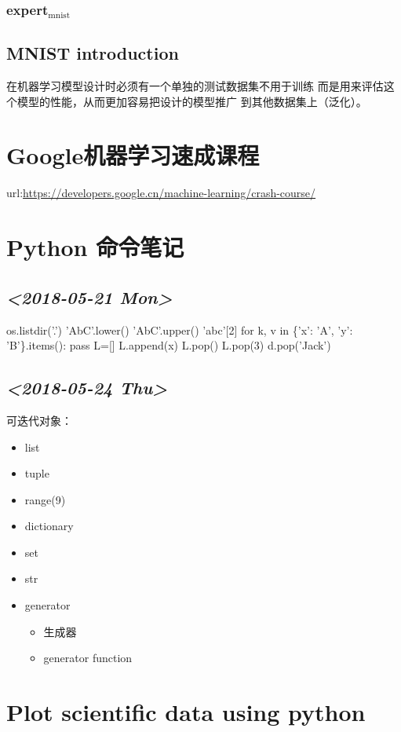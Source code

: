 \documentclass[11pt]{article}
\begin{document}
\subsubsection{expert\(_{\text{mnist}}\)}
\label{sec:orgc870cb3}
\subsection{MNIST introduction}
\label{sec:orgf936e7b}
在机器学习模型设计时必须有一个单独的测试数据集不用于训练
而是用来评估这个模型的性能，从而更加容易把设计的模型推广
到其他数据集上（泛化）。
\section{Google机器学习速成课程}
\label{sec:org5cb3d6a}
url:\url{https://developers.google.cn/machine-learning/crash-course/}
\section{Python 命令笔记}
\label{sec:org3ba885d}
\subsection{\textit{<2018-05-21 Mon>}}
\label{sec:org275a2d7}
os.listdir('.')
'AbC'.lower()
'AbC'.upper()
'abc'[2]
for k, v in \{'x': 'A', 'y': 'B'\}.items():
    pass
L=[]
L.append(x)
L.pop()
L.pop(3)
d.pop('Jack')
\subsection{\textit{<2018-05-24 Thu>}}
\label{sec:org8c03e0c}
可迭代对象：
\begin{itemize}
\item list
\item tuple
\item range(9)
\item dictionary
\item set
\item str
\item generator
\begin{itemize}
\item 生成器
\item generator function
\end{itemize}
\end{itemize}
\section{Plot scientific data using python}
\label{sec:org889d86b}
\end{document}
